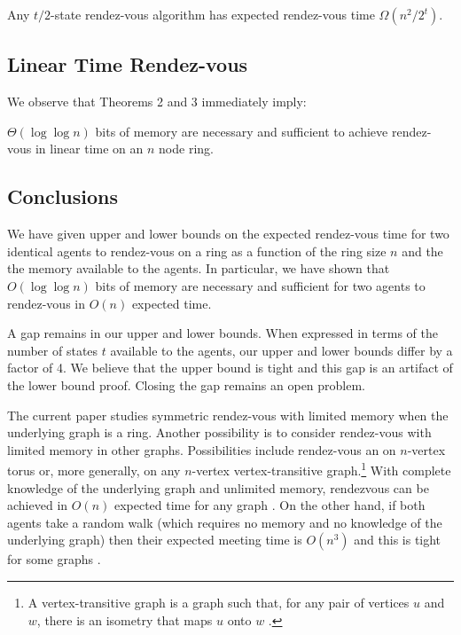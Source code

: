 \documentclass{patmorin}
\begin{document}
\begin{thm}
Any $t/2$-state rendez-vous algorithm has expected rendez-vous time
$\Omega(n^2/2^{t})$.
\end{thm}

\subsection{Linear Time Rendez-vous}

We observe that Theorems 2 and 3 immediately imply:

\begin{thm}
$\Theta( \log \log n)$ bits of memory are necessary and sufficient to 
achieve rendez-vous in linear time on an $n$ node ring.
\end{thm}

\subsection{Conclusions}

We have given upper and lower bounds on the expected rendez-vous time
for two identical agents to rendez-vous on a ring as a function of the
ring size $n$ and the the memory available to the agents.  In
particular, we have shown that $O(\log\log n)$ bits of memory are
necessary and sufficient for two agents to rendez-vous in $O(n)$
expected time.

A gap remains in our upper and lower bounds.  When expressed in terms
of the number of states $t$ available to the agents, our upper and
lower bounds differ by a factor of 4.  We believe that the upper bound
is tight and this gap is an artifact of the lower bound proof.
Closing the gap remains an open problem.

The current paper studies symmetric rendez-vous with limited memory
when the underlying graph is a ring. Another possibility is to consider
rendez-vous with limited memory in other graphs.  Possibilities include
rendez-vous an on $n$-vertex torus or, more generally, on any $n$-vertex
vertex-transitive graph.\footnote{A vertex-transitive graph is a graph
such that, for any pair of vertices $u$ and $w$, there is an isometry that
maps $u$ onto $w$ \cite[Chapter~15]{alpernGal03}.} With complete knowledge
of the underlying graph and unlimited memory, rendezvous can be achieved
in $O(n)$ expected time for any graph \cite[Section~15.2]{alpernGal03}.
On the other hand, if both agents take a random walk (which requires
no memory and no knowledge of the underlying graph) then their
expected meeting time is $O(n^3)$ and this is tight for some graphs
\cite{coppersmith}.





\end{document}
